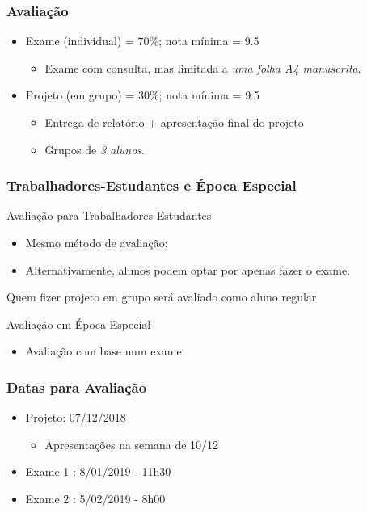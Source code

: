 \documentclass{beamer}
\begin{document}
\begin{frame}
    \frametitle{Avaliação}
    \begin{itemize}
    \item Exame (individual) = 70\%; nota mínima = 9.5
        \begin{itemize}
        \item Exame com consulta, mas limitada a \emph{uma folha A4
              manuscrita}.
        \end{itemize}
    \item Projeto (em grupo) = 30\%; nota mínima = 9.5
        \begin{itemize}
        \item Entrega de relatório + apresentação final do projeto
        \item Grupos de \emph{3 alunos}.
        \end{itemize}\end{itemize}    
\end{frame}

\begin{frame} 
    \frametitle{Trabalhadores-Estudantes e Época Especial} 
   \begin{block}{Avaliação para Trabalhadores-Estudantes}
   \begin{itemize}
    \item Mesmo método de avaliação;
	\item Alternativamente, alunos podem optar por apenas fazer o exame.
   \end{itemize}
   Quem fizer projeto em grupo será avaliado como aluno regular
   \end{block}
   \begin{block}{Avaliação em Época Especial}
   \begin{itemize}
   \item Avaliação com base num exame.
   \end{itemize}
   \end{block}
\end{frame}

\begin{frame} 
    \frametitle{Datas para Avaliação}
    \begin{itemize}
	\item Projeto: 07/12/2018
        \begin{itemize}
        \item Apresentações na semana de 10/12
        \end{itemize}
    \item Exame 1 : 8/01/2019 - 11h30
    \item Exame 2 : 5/02/2019 - 8h00
    \end{itemize}
\end{frame}
\end{document}
